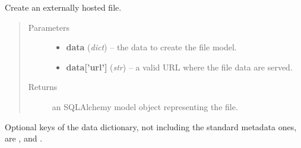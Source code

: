 \documentclass[letterpaper,10pt,english]{sphinxmanual}
\begin{document}

\begin{fulllineitems}
\label{api:onlinelinguisticdatabase.controllers.files.createExternallyHostedFile}
Create an externally hosted file.
\begin{quote}\begin{description}
\item[{Parameters}] \leavevmode\begin{itemize}
\item {} 
\textbf{data} (\emph{dict}) -- the data to create the file model.

\item {} 
\textbf{data{[}'url'{]}} (\emph{str}) -- a valid URL where the file data are served.

\end{itemize}

\item[{Returns}] \leavevmode
an SQLAlchemy model object representing the file.

\end{description}\end{quote}

Optional keys of the data dictionary, not including the standard metadata
ones, are ,  and .

\end{fulllineitems}

\end{document}
